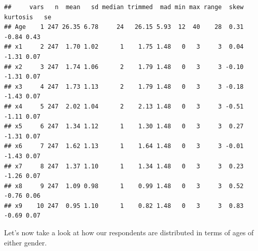 \documentclass[
]{article}
\newenvironment{Shaded}{\begin{snugshade}}{\end{snugshade}}
\newcommand{\AttributeTok}[1]{\textcolor[rgb]{0.77,0.63,0.00}{#1}}
\newcommand{\DecValTok}[1]{\textcolor[rgb]{0.00,0.00,0.81}{#1}}
\newcommand{\FunctionTok}[1]{\textcolor[rgb]{0.00,0.00,0.00}{#1}}
\newcommand{\NormalTok}[1]{#1}
\newcommand{\OtherTok}[1]{\textcolor[rgb]{0.56,0.35,0.01}{#1}}
\newcommand{\SpecialCharTok}[1]{\textcolor[rgb]{0.00,0.00,0.00}{#1}}
\newcommand{\StringTok}[1]{\textcolor[rgb]{0.31,0.60,0.02}{#1}}
\begin{document}
\begin{verbatim}
##     vars   n  mean   sd median trimmed  mad min max range  skew kurtosis   se
## Age    1 247 26.35 6.78     24   26.15 5.93  12  40    28  0.31    -0.84 0.43
## x1     2 247  1.70 1.02      1    1.75 1.48   0   3     3  0.04    -1.31 0.07
## x2     3 247  1.74 1.06      2    1.79 1.48   0   3     3 -0.10    -1.31 0.07
## x3     4 247  1.73 1.13      2    1.79 1.48   0   3     3 -0.18    -1.43 0.07
## x4     5 247  2.02 1.04      2    2.13 1.48   0   3     3 -0.51    -1.11 0.07
## x5     6 247  1.34 1.12      1    1.30 1.48   0   3     3  0.27    -1.31 0.07
## x6     7 247  1.62 1.13      1    1.64 1.48   0   3     3 -0.01    -1.43 0.07
## x7     8 247  1.37 1.10      1    1.34 1.48   0   3     3  0.23    -1.26 0.07
## x8     9 247  1.09 0.98      1    0.99 1.48   0   3     3  0.52    -0.76 0.06
## x9    10 247  0.95 1.10      1    0.82 1.48   0   3     3  0.83    -0.69 0.07
\end{verbatim}

Let's now take a look at how our respondents are distributed in terms of
ages of either gender.

\begin{Shaded}
\end{Shaded}
\end{document}
